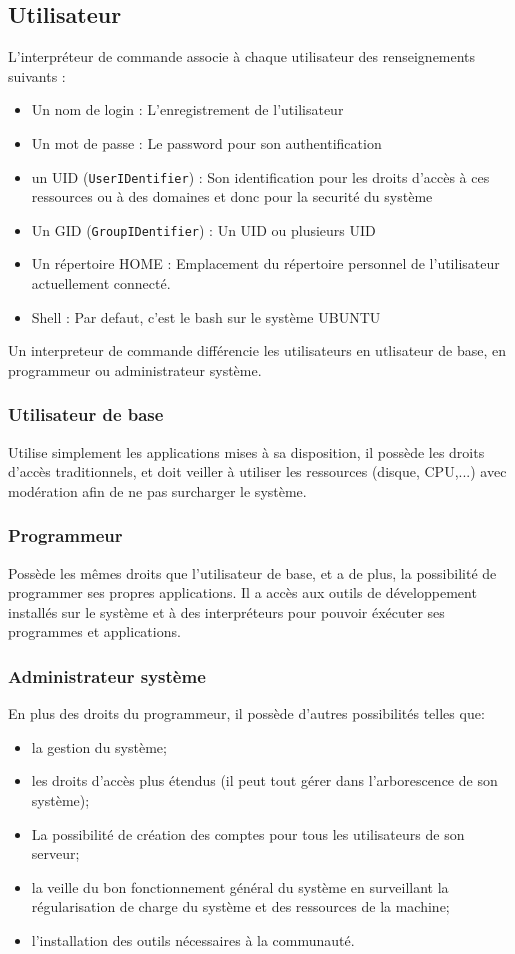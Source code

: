 \subsection{Utilisateur}
L'interpréteur de commande associe à chaque utilisateur des renseignements suivants :
\begin{itemize}
    \item Un nom de login : L'enregistrement de l'utilisateur 
    \item Un mot de passe : Le password pour son authentification
    \item un UID (\texttt{UserIDentifier}) : Son identification pour les droits d'accès à ces ressources ou à des domaines et donc pour la securité du système 
    \item Un GID (\texttt{GroupIDentifier}) : Un UID ou plusieurs UID
    \item Un répertoire HOME : Emplacement du répertoire personnel de l'utilisateur actuellement connecté.
    \item Shell : Par defaut, c'est le bash sur le système UBUNTU
\end{itemize}
Un interpreteur de commande différencie les utilisateurs en utlisateur de base, en programmeur ou administrateur système.

\subsubsection{Utilisateur de base}
Utilise simplement les applications mises à sa disposition, il possède les droits d'accès traditionnels, et doit veiller à utiliser les ressources (disque, CPU,...) avec modération afin de ne pas surcharger le système.

\subsubsection{Programmeur}
Possède les mêmes droits que l'utilisateur de base, et a de plus, la possibilité de programmer ses propres applications. Il a accès aux outils de développement installés sur le système et à des interpréteurs pour pouvoir éxécuter ses programmes et applications. 

\subsubsection{Administrateur système}
En plus des droits du programmeur, il possède d'autres possibilités telles que: 
\begin{itemize}
    
\item la gestion du système;
\item les droits d'accès plus étendus (il peut tout gérer dans l'arborescence de son système);
\item La possibilité de création des comptes pour tous les utilisateurs de son serveur;
\item la veille du bon fonctionnement général du système en surveillant la régularisation de charge du système et des ressources de la machine;
\item l'installation des outils nécessaires à la communauté.
\end{itemize}

